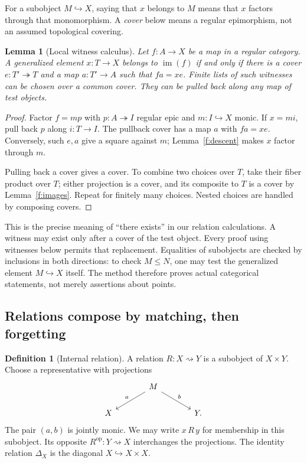 \documentclass[11pt]{article}
\newtheorem{lemma}[theorem]{Lemma}
\theoremstyle{definition}
\newtheorem{definition}[theorem]{Definition}
\theoremstyle{remark}\newtheorem{remark}[theorem]{Remark}
\DeclareMathOperator{\im}{im}
\begin{document}
For a subobject $M\hookrightarrow X$, saying that $x$ belongs to $M$
means that $x$ factors through that monomorphism. A \emph{cover} below
means a regular epimorphism, not an assumed topological covering.

\begin{lemma}[Local witness calculus]\label{f:local-calculus}
Let $f:A\to X$ be a map in a regular category. A generalized element
$x:T\to X$ belongs to $\im(f)$ if and only if there is a cover
$e:T'\twoheadrightarrow T$ and a map $a:T'\to A$ such that $fa=xe$.
Finite lists of such witnesses can be chosen over a common cover.
They can be pulled back along any map of test objects.
\end{lemma}
\begin{proof}
Factor $f=mp$ with $p:A\twoheadrightarrow I$ regular epic and $m:I\hookrightarrow X$
monic. If $x=mi$, pull back $p$ along $i:T\to I$. The pullback cover
has a map $a$ with $fa=xe$. Conversely, such $e,a$ give a square
against $m$; Lemma~\ref{f:descent} makes $x$ factor through $m$.

Pulling back a cover gives a cover. To combine two choices over $T$,
take their fiber product over $T$; either projection is a cover, and
its composite to $T$ is a cover by Lemma~\ref{f:images}. Repeat for
finitely many choices. Nested choices are handled by composing covers.
\end{proof}

This is the precise meaning of ``there exists'' in our relation
calculations. A witness may exist only after a cover of the test object.
Every proof using witnesses below permits that replacement. Equalities
of subobjects are checked by inclusions in both directions: to check
$M\leq N$, one may test the generalized element $M\hookrightarrow X$
itself. The method therefore proves actual categorical statements,
not merely assertions about points.

\subsection{Relations compose by matching, then forgetting}

\begin{definition}[Internal relation]
A relation $R:X\rightsquigarrow Y$ is a subobject of $X\times Y$.
Choose a representative with projections
\[
\begin{tikzcd}[column sep=large]
& M \arrow[dl,"a"'] \arrow[dr,"b"] &\\
X && Y.
\end{tikzcd}
\]
The pair $(a,b)$ is jointly monic. We may write $x\,R\,y$ for membership
in this subobject. Its opposite $R^{\mathrm{op}}:Y\rightsquigarrow X$
interchanges the projections. The identity relation $\Delta_X$ is the
diagonal $X\hookrightarrow X\times X$.
\end{definition}
\end{document}
